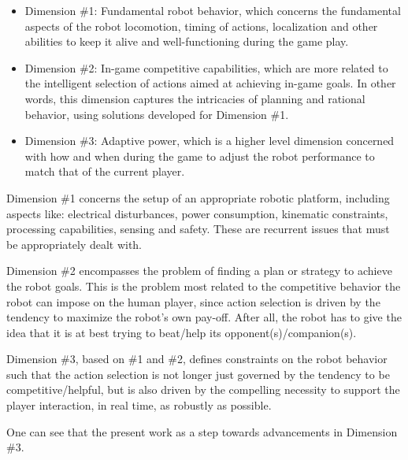 \begin{itemize}[leftmargin=*,labelsep=5.8mm]
\item {Dimension \#1: Fundamental robot behavior}, which concerns the fundamental aspects of the robot locomotion, timing of actions, localization and other abilities to keep it alive and well-functioning during the game play.
\item {Dimension \#2: In-game competitive capabilities}, which are more related to the intelligent selection of actions aimed at achieving in-game goals. In other words, this dimension captures the intricacies of planning and rational behavior, using solutions developed for Dimension \#1.
\item {Dimension \#3: Adaptive power}, which is a higher level dimension concerned with how and when during the game to adjust the robot performance to match that of the current player.
\end{itemize}

Dimension \#1 concerns the setup of an appropriate robotic platform, including aspects like: electrical disturbances, power consumption, kinematic constraints, processing capabilities, sensing and safety. These are recurrent issues that must be appropriately dealt with. 

Dimension \#2 encompasses the problem of finding a plan or strategy to achieve the robot goals. This is the problem most related to the competitive behavior the robot can impose on the human player, since action selection is driven by the tendency to maximize the robot's own pay-off. After all, the robot has to give the idea that it is at best trying to beat/help its opponent(s)/companion(s).

Dimension \#3, based on \#1 and \#2, defines constraints on the robot behavior such that the action selection is not longer just governed by the tendency to be competitive/helpful, but is also driven by the compelling necessity to support the player interaction, in real time, as robustly as possible.

One can see that the present work as a step towards advancements in Dimension \#3.

